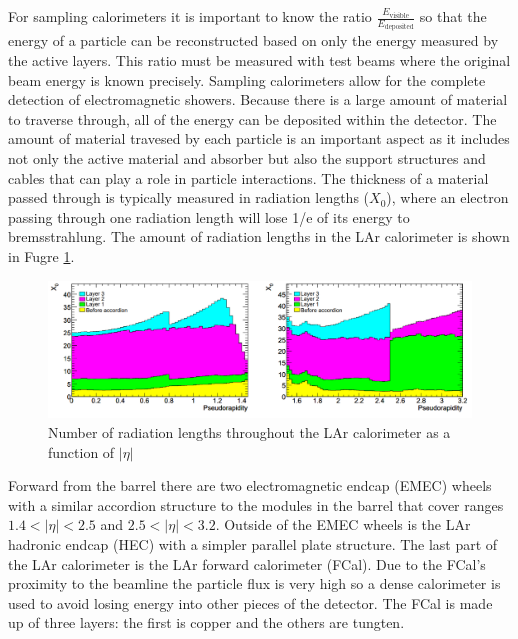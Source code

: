 For sampling calorimeters it is important to know the ratio $\frac{E_{\text{visible}}}{E_{\text{deposited}}}$ so that the energy of a particle can be reconstructed based on only the energy measured by the active layers.  This ratio must be measured with test beams where the original beam energy is known precisely.  Sampling calorimeters allow for the complete detection of electromagnetic showers.  Because there is a large amount of material to traverse through, all of the energy can be deposited within the detector. The amount of material travesed by each particle is an important aspect as it includes not only the active material and absorber but also the support structures and cables that can play a role in particle interactions.  The thickness of a material passed through is typically measured in radiation lengths ($X_0$), where an electron passing through one radiation length will lose 1/e of its energy to bremsstrahlung.  The amount of radiation lengths in the LAr calorimeter is shown in Fugre \ref{fig:MaterialBudget}.  

\begin{figure}[h!]
	\centering
	\includegraphics[width=\columnwidth]{../ThesisImages/LHCImages/MaterialBudget.png}
	\caption[Number of radiation lengths throughout the LAr calorimeter as a function of $|\eta|$]{Number of radiation lengths throughout the LAr calorimeter as a function of $|\eta|$\cite{ATLAS}
	}
	\label{fig:MaterialBudget}
\end{figure}

Forward from the barrel there are two electromagnetic endcap (EMEC) wheels with a similar accordion structure to the modules in the barrel that cover ranges $1.4<|\eta|<2.5$ and $2.5<|\eta|<3.2$.  Outside of the EMEC wheels is the LAr hadronic endcap (HEC) with a simpler parallel plate structure.  The last part of the LAr calorimeter is the LAr forward calorimeter (FCal).  Due to the FCal's proximity to the beamline the particle flux is very high so a dense calorimeter is used to avoid losing energy into other pieces of the detector.  The FCal is made up of three layers: the first is copper and the others are tungten.  

